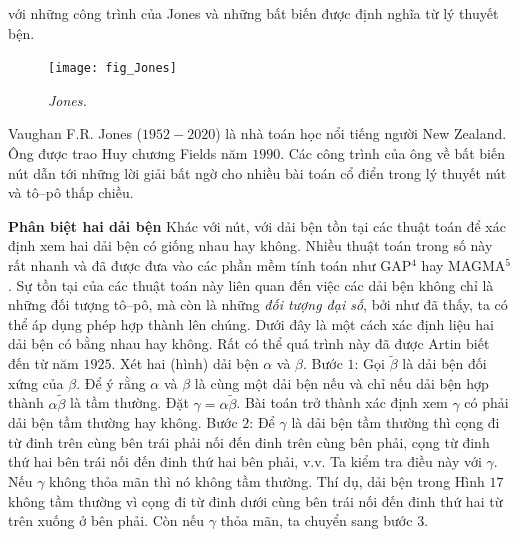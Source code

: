 \begin{multicols}{2}
	với những công trình của Jones và những bất biến được định nghĩa từ lý thuyết bện.
	\begin{tBox}
		\begin{figure}
			\vspace*{-15pt}
			\centering
			\captionsetup{labelformat= empty, justification=centering}
			\hspace*{-10pt}\texttt{[image: fig\_Jones]}
			\caption{\small\textit{\color{duongvaotoanhoc}Jones.}}
			\vspace*{-15pt}
		\end{figure}
		Vaughan F.R. Jones ($1952-2020$) là nhà toán học nổi tiếng người New Zealand. Ông được trao Huy chương Fields năm $1990$. Các công trình của ông về bất biến nút dẫn tới những lời giải bất ngờ cho nhiều bài toán cổ điển trong lý thuyết nút và tô--pô thấp chiều.
	\end{tBox}
	\textbf{\color{duongvaotoanhoc}Phân biệt hai dải bện}
	\vskip 0.1cm
	Khác với nút, với dải bện tồn tại các thuật toán để xác định xem hai dải bện có giống nhau hay không. Nhiều thuật toán trong số này rất nhanh và đã được đưa vào các phần mềm tính toán như GAP$^4$ hay MAGMA$^5$. Sự tồn tại của các thuật toán này liên quan đến việc các dải bện không chỉ là những đối tượng tô--pô, mà còn là những \textit{đối tượng đại số}, bởi như đã thấy, ta có thể áp dụng phép hợp thành lên chúng. Dưới đây là một cách xác định liệu hai dải bện có bằng nhau hay không. Rất có thể quá trình này đã được Artin biết đến từ năm $1925$.
	\vskip 0.1cm
	Xét hai (hình) dải bện $\alpha$ và $\beta$.
	\vskip 0.1cm
	Bước $1$: Gọi $\tilde \beta$ là dải bện đối xứng của $\beta$. Để ý rằng $\alpha$ và $\beta$ là cùng một dải bện nếu và chỉ nếu dải bện hợp thành $\alpha \tilde \beta$ là tầm thường. Đặt $\gamma = \alpha \tilde \beta$. Bài toán trở thành xác định xem $\gamma$ có phải dải bện tầm thường hay không.
	\vskip 0.1cm
	Bước $2$: Để $\gamma$ là dải bện tầm thường thì cọng đi từ đinh trên cùng bên trái phải nối đến đinh trên cùng bên phải, cọng từ đinh thứ hai bên trái nối đến đinh thứ hai bên phải, v.v. Ta kiểm tra điều này với $\gamma$. Nếu $\gamma$ không thỏa mãn thì nó không tầm thường. Thí dụ, dải bện trong Hình $17$ không tầm thường vì cọng đi từ đinh dưới cùng bên trái nối đến đinh thứ hai từ trên xuống ở bên phải. Còn nếu $\gamma$ thỏa mãn, ta chuyển sang bước $3$.
	\begin{figure}[H]
		\vspace*{-5pt}

\end{figure}
\end{multicols}
